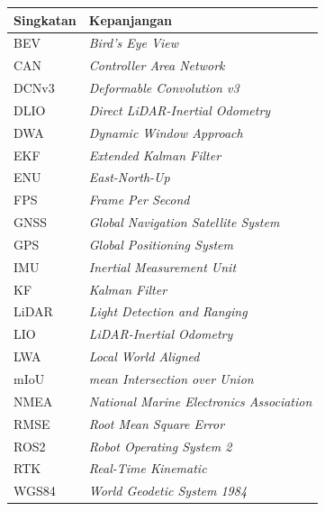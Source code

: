 \vspace{2ex}
\begin{longtable}{p{} p{}}
\hline
\textbf{Singkatan} & \textbf{Kepanjangan} \\
\hline
\endhead
BEV & \emph{Bird's Eye View} \\
CAN & \emph{Controller Area Network} \\
DCNv3 & \emph{Deformable Convolution v3} \\
DLIO & \emph{Direct LiDAR-Inertial Odometry} \\
DWA & \emph{Dynamic Window Approach} \\
EKF & \emph{Extended Kalman Filter} \\
ENU & \emph{East-North-Up} \\
FPS & \emph{Frame Per Second} \\
GNSS & \emph{Global Navigation Satellite System} \\
GPS & \emph{Global Positioning System} \\
IMU & \emph{Inertial Measurement Unit} \\
KF & \emph{Kalman Filter} \\
LiDAR & \emph{Light Detection and Ranging} \\
LIO & \emph{LiDAR-Inertial Odometry} \\
LWA & \emph{Local World Aligned} \\
mIoU & \emph{mean Intersection over Union} \\
NMEA & \emph{National Marine Electronics Association} \\
RMSE & \emph{Root Mean Square Error} \\
ROS2 & \emph{Robot Operating System 2} \\
RTK & \emph{Real-Time Kinematic} \\
WGS84 & \emph{World Geodetic System 1984} \\
\hline
\end{longtable}

\clearpage

